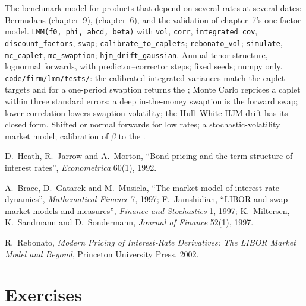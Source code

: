 \begin{build}
 The benchmark model for products that depend on several rates
at several dates: Bermudans (chapter~9),  (chapter~6), and the
validation of chapter~7's one-factor model.
 \texttt{LMM(f0, phi, abcd, beta)} with \texttt{vol},
\texttt{corr}, \texttt{integrated\_cov}, \texttt{discount\_factors}, \texttt{swap};
\texttt{calibrate\_to\_caplets}; \texttt{rebonato\_vol}; \texttt{simulate},
\texttt{mc\_caplet}, \texttt{mc\_swaption}; \texttt{hjm\_drift\_gaussian}.
 Annual tenor structure, lognormal forwards,  with
predictor--corrector steps; fixed seeds; numpy only.
 \texttt{code/firm/lmm/tests/}: the calibrated integrated
variances match the caplet targets and  for a one-period
swaption returns the ; Monte Carlo reprices a caplet within
three standard errors; a deep in-the-money swaption is the forward swap; lower
correlation lowers swaption volatility; the Hull--White HJM drift has its
closed form.
 Shifted or normal forwards for low rates; a stochastic-volatility
market model; calibration of $\beta$ to the .
\end{build}

\begin{omsources}
\item D.\ Heath, R.\ Jarrow and A.\ Morton, ``Bond pricing and the term structure of
interest rates'', \emph{Econometrica} 60(1), 1992.
\item A.\ Brace, D.\ Gatarek and M.\ Musiela, ``The market model of interest rate
dynamics'', \emph{Mathematical Finance} 7, 1997; F.\ Jamshidian, ``LIBOR and swap
market models and measures'', \emph{Finance and Stochastics} 1, 1997; K.\
Miltersen, K.\ Sandmann and D.\ Sondermann, \emph{Journal of Finance} 52(1), 1997.
\item R.\ Rebonato, \emph{Modern Pricing of Interest-Rate Derivatives: The LIBOR
Market Model and Beyond}, Princeton University Press, 2002.
\end{omsources}

\section{Exercises}

